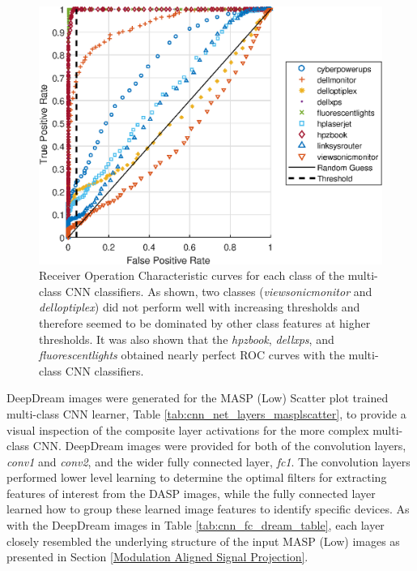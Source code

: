 \begin{figure}[htbp!]
	\includegraphics[width=\textwidth]{./dasp_algorithm_results/dasp_cnn_multi_nonemultirmvd_roc.eps}
	\centering
	\caption{Receiver Operation Characteristic curves for each class of the multi-class CNN classifiers.   As shown, two classes (\textit{viewsonicmonitor} and \textit{delloptiplex}) did not perform well with increasing thresholds and therefore seemed to be dominated by other class features at higher thresholds.  It was also shown that the \textit{hpzbook}, \textit{dellxps}, and \textit{fluorescentlights} obtained nearly perfect ROC curves with the multi-class CNN classifiers.}
	\label{fig:cnnmultinonermvdroc}
\end{figure}

DeepDream images were generated for the MASP (Low) Scatter plot trained multi-class CNN learner, Table \ref{tab:cnn_net_layers_masplscatter}, to provide a visual inspection of the composite layer activations for the more complex multi-class CNN.  DeepDream images were provided for both of the convolution layers, \textit{conv1} and \textit{conv2}, and the wider fully connected layer, \textit{fc1}.  The convolution layers performed lower level learning to determine the optimal filters for extracting features of interest from the DASP images, while the fully connected layer learned how to group these learned image features to identify specific devices.  As with the DeepDream images in Table \ref{tab:cnn_fc_dream_table}, each layer closely resembled the underlying structure of the input MASP (Low) images as presented in Section \ref{Modulation Aligned Signal Projection}.

